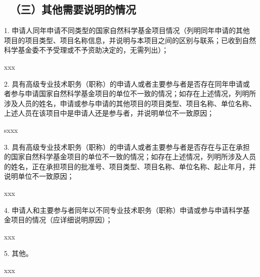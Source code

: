{\color{MsBlue} \subsection{\sihao \kaishu \quad \ （三）其他需要说明的情况}}

{\sihao \kaishu \color{MsBlue}
	1. 申请人同年申请不同类型的国家自然科学基金项目情况（列明同年申请的其他项目的项目类型、项目名称信息，并说明与本项目之间的区别与联系；已收到自然科学基金委不予受理或不予资助决定的，无需列出）；
}

{\kaishu
	xxx
}
\vspace{3mm}

{\sihao \kaishu \color{MsBlue}
	2. 具有高级专业技术职务（职称）的申请人或者主要参与者是否存在同年申请或者参与申请国家自然科学基金项目的单位不一致的情况；如存在上述情况，列明所涉及人员的姓名，申请或参与申请的其他项目的项目类型、项目名称、单位名称、上述人员在该项目中是申请人还是参与者，并说明单位不一致原因；
}


{\kaishu
	sxxx
}
\vspace{3mm}

{\sihao \kaishu \color{MsBlue}
	3. 具有高级专业技术职务（职称）的申请人或者主要参与者是否存在与正在承担的国家自然科学基金项目的单位不一致的情况；如存在上述情况，列明所涉及人员的姓名，正在承担项目的批准号、项目类型、项目名称、单位名称、起止年月，并说明单位不一致原因；
}

{\kaishu
	xxx
}

\vspace{3mm}

{\sihao \kaishu \color{MsBlue}
	4. 申请人和主要参与者同年以不同专业技术职务（职称）申请或参与申请科学基金项目的情况（应详细说明原因）；
}

{\kaishu
	xxx
}
\vspace{3mm}

{\sihao \kaishu \color{MsBlue}
	5. 其他。
}

{\kaishu
	xxx
}